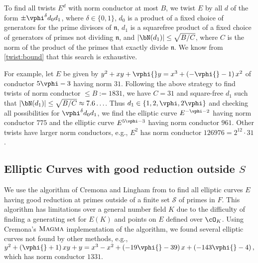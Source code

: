 \documentclass{amsart}
\newcommand{\n}{\mathfrak{n}}
\begin{document}
To find all twists $E^d$ with norm conductor at most $B$, we twist $E$
by all $d$ of the form $\pm \vphi^{\delta} d_0 d_1$, where $\delta\in
\{0,1\}$, $d_0$ is a product of a fixed choice of generators for
the prime divisors of $\n$, 
$d_1$ is a squarefree product of a fixed choice of generators of 
primes not dividing $\n$, and
$|\bN(d_1)| \leq \sqrt{B/C}$, where $C$ is the norm of the product of
the primes that exactly divide $\n$. We know from \ref{twist:bound} that 
this search is exhaustive.


For example, let $E$ be given by $y^2 + xy + \vphi{}y = x^3 +
\left(-\vphi{} - 1\right)x^2 $ of conductor $5\vphi - 3$ having norm $31$.
Following the above strategy to find twists of norm conductor $\leq
B := 1831$, we have $C=31$ and square-free $d_1$ such that
$|\bN(d_1)| \leq \sqrt{B/C} \approx 7.6\ldots$. Thus $d_1 \in \{1, 2,
\vphi, 2\vphi\}$ and checking all possibilities for
$\vphi^{\delta} d_0 d_1$, we find the elliptic curve $E^{-\vphi-2}$ having
norm conductor $775$ and the elliptic curve $E^{5\vphi-3}$ having norm conductor
$961$. Other twists have larger norm conductors, e.g., $E^2$ has norm
conductor $126976=2^{12}\cdot 31$.


\subsection{Elliptic Curves with good reduction outside $S$}\label{sec:cremona-lingham}

We use the algorithm of Cremona and Lingham from
\cite{cremona-lingham} to find all elliptic curves $E$ having good
reduction at primes outside of a finite set $\mathcal{S}$ of primes in
$F$. This algorithm has limitations over a general number
field $K$ due to the difficulty of finding a generating set for $E(K)$ and
points on $E$ defined over $\cO_K$.
Using Cremona's $\textsc{Magma}$ implementation of the algorithm, we 
found several elliptic curves not found by other methods, e.g.,
$y^2 + \left(\vphi{} +  1\right)xy + y = x^3 -x^2 + \left(-19 \vphi{} - 
 39\right)x + \left(-143 \vphi{} - 4\right),$ 
which has norm conductor $1331$.
\end{document}
